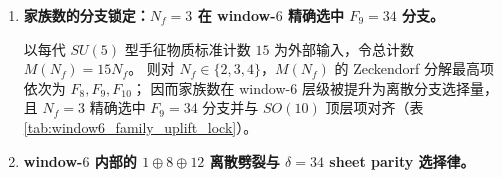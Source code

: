 \begin{enumerate}
  \begin{theorem}\label{thm:terminal-window6-unification-triple-dynamic}
  在 \(m=6\) 的最小非平凡锚点上，三元组
  \[
  (F_8,F_9,F_{10})=(21,34,55)
  \]
  同时以三种互相独立的接口出现：
  \begin{enumerate}
    \item \textbf{uplift 尾部偏移：}window-\(6\) dyadic uplift 的非零尾部偏移仅可能取自 \(\{F_8,F_9,F_{10}\}=\{21,34,55\}\)（定理 \ref{thm:terminal-window6-tail-three-branch}）。
    \item \textbf{时间返回尺度：}令 \(\mathcal R_6\) 为定义 \ref{def:terminal-reset-events} 的复位事件集合，则其返回时间二值谱为 \(\{F_9,F_{10}\}=\{34,55\}\)（定理 \ref{thm:terminal-reset-events-sturmian}），而进入复位分支所需的最小 tail 触发尺度为 \(F_8=21\)（定理 \ref{thm:terminal-succ-unique-branch-merge} 中 \(b_m\) 的 \(c_{m+1}=1\) 分支）。
    \item \textbf{GUT 顶层 Zeckendorf 项：}同一三元组分别是 \(SU(5),SO(10),E_6\) 维数 Zeckendorf 分解的最高斐波那契项（表 \ref{tab:zeckendorf_gut_signatures}），从而在 window-\(6\) 下被动态地实现为“复位触发尺度 + 返回时间尺度”的组合，而非静态数值配对。
  \end{enumerate}
  因此，window-\(6\) 的 \(\{21,34,55\}\) 不是事后匹配出的数表，而是由 Zeckendorf 截断折叠与时间推进机制内生强制出现的统一三重交点。
  \end{theorem}

  \item \textbf{家族数的分支锁定：\texorpdfstring{$N_f=3$}{Nf=3} 在 window-\(6\) 精确选中 \texorpdfstring{$F_9=34$}{F9=34} 分支。}

  \begin{theorem}[家族数锁定的三分支选择律]
  \label{thm:terminal-family-uplift-lock}
  以每代 \(SU(5)\) 型手征物质标准计数 \(15\) 为外部输入，令总计数 \(M(N_f)=15N_f\)。
  则对 \(N_f\in\{2,3,4\}\)，\(M(N_f)\) 的 Zeckendorf 分解最高项依次为 \(F_8,F_9,F_{10}\)；
  因而家族数在 window-\(6\) 层级被提升为离散分支选择量，且 \(N_f=3\) 精确选中 \(F_9=34\) 分支并与 \(SO(10)\) 顶层项对齐（表 \ref{tab:window6_family_uplift_lock}）。
  \end{theorem}

  \item \textbf{window-\(6\) 内部的 \texorpdfstring{$1\oplus 8\oplus 12$}{1+8+12} 离散劈裂与 \texorpdfstring{$\delta=34$}{δ=34} sheet parity 选择律。}


\end{enumerate}
